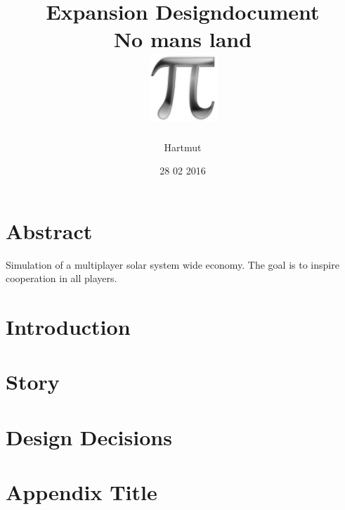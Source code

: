 \documentclass[a4paper,10pt]{book}
\title{
	{Expansion Designdocument}\\
	{\large No mans land}\\
	{\includegraphics{pi-black.png}}
}
\author{Hartmut}
\date{28 02 2016}
\begin{document}
\maketitle

\chapter*{Abstract}
Simulation of a multiplayer solar system wide economy.
The goal is to inspire cooperation in all players.


\tableofcontents
\chapter{Introduction}

\chapter{Story}


\chapter{Design Decisions}


\appendix
\chapter{Appendix Title}

\end{document}
